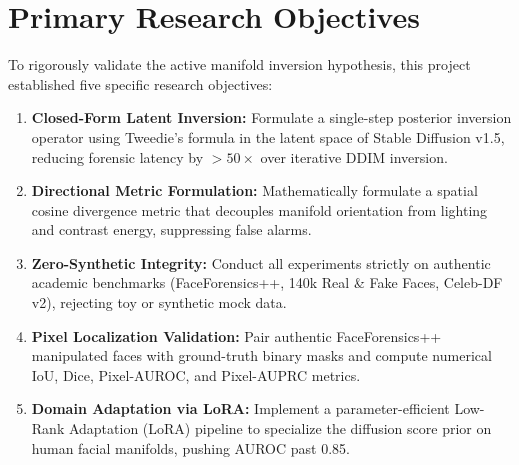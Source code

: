 \documentclass[12pt,a4paper]{report}
\begin{document}
\section{Primary Research Objectives}
To rigorously validate the active manifold inversion hypothesis, this project established five specific research objectives:
\begin{enumerate}
    \item \textbf{Closed-Form Latent Inversion:} Formulate a single-step posterior inversion operator using Tweedie's formula in the latent space of Stable Diffusion v1.5, reducing forensic latency by $>50\times$ over iterative DDIM inversion.
    \item \textbf{Directional Metric Formulation:} Mathematically formulate a spatial cosine divergence metric that decouples manifold orientation from lighting and contrast energy, suppressing false alarms.
    \item \textbf{Zero-Synthetic Integrity:} Conduct all experiments strictly on authentic academic benchmarks (FaceForensics++, 140k Real \& Fake Faces, Celeb-DF v2), rejecting toy or synthetic mock data.
    \item \textbf{Pixel Localization Validation:} Pair authentic FaceForensics++ manipulated faces with ground-truth binary masks and compute numerical IoU, Dice, Pixel-AUROC, and Pixel-AUPRC metrics.
    \item \textbf{Domain Adaptation via LoRA:} Implement a parameter-efficient Low-Rank Adaptation (LoRA) pipeline to specialize the diffusion score prior on human facial manifolds, pushing AUROC past 0.85.
\end{enumerate}
\end{document}
